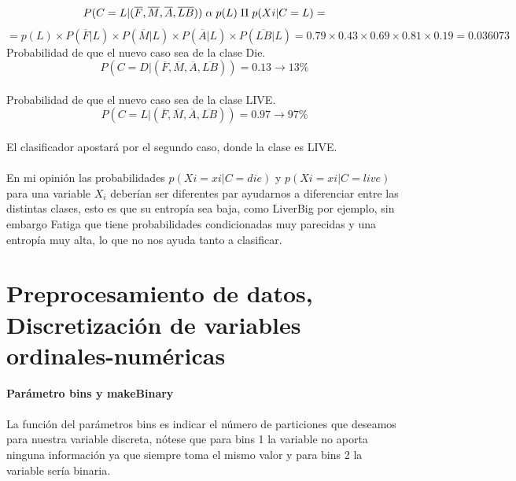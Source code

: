 \documentclass[es]{ifirak}
\begin{document}
\begin{displaymath}
P (C = L | ( \overline{F} , \overline{M} ,\overline{A} , \overline{LB}) )\hspace{0.1cm}  \alpha  \hspace{0.1cm}p(L)\hspace{0.1cm} \Pi \hspace{0.1cm} p( Xi | C = L)  =
\end{displaymath}
\begin{displaymath}
=p(L)\times P(\overline{F} | L )\times P( \overline{M} | L )\times P(\overline{A}  | L ) \times P(\overline{LB} | L) = 0.79 \times 0.43 \times 0.69 \times 0.81 \times 0.19 = 0.036073
\end{displaymath}
Probabilidad de que el nuevo caso sea de la clase Die.\\
\begin{displaymath}
 P(C = D | ( \overline{F} , \overline{M} , \overline{A} , \overline{LB}) ) = 0.13 \rightarrow 13\%
\end{displaymath}\\
Probabilidad de que el nuevo caso sea de la clase LIVE.\\
\begin{displaymath}
 P (C = L | ( \overline{F} , \overline{M} , \overline{A} , \overline{LB}) ) =  0.97 \rightarrow 97\%
\end{displaymath}\\
El clasificador apostará por el segundo caso, donde la clase es LIVE.\\

\paragraph{}
En mi opinión las probabilidades $p(Xi=xi|C=die)$ y $p(Xi=xi|C=live)$ para una variable $X_i$ deberían ser diferentes par ayudarnos a diferenciar entre las distintas clases, esto es que su entropía sea baja, como LiverBig por ejemplo, sin embargo Fatiga que tiene probabilidades condicionadas muy parecidas y una entropía muy alta, lo que no nos ayuda tanto a clasificar.

\section{Preprocesamiento de datos, Discretización de variables ordinales-numéricas}

\textbf{Parámetro bins y makeBinary}
\paragraph{}
La función del parámetros bins es indicar el número de particiones que deseamos para nuestra variable discreta, nótese que para bins 1 la variable no aporta ninguna información ya que siempre toma el mismo valor y para bins 2 la variable sería binaria. 
\end{document}
